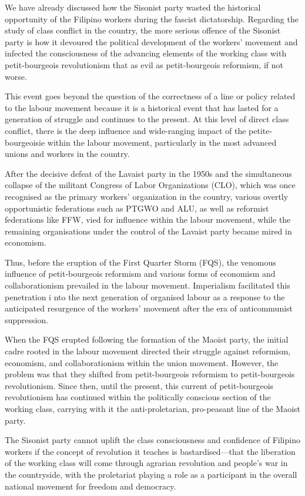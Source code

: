 We have already discussed 
how the Sisonist party 
wasted the historical opportunity of the Filipino workers 
during the fascist dictatorship. 
Regarding the study of class conflict in the country, 
the more serious offence of the Sisonist party 
is how it devoured the political development of the workers' movement 
and infected the consciousness of the advancing elements of the working class 
with petit-bourgeois revolutionism
that as evil as petit-bourgeois reformism,
if not worse.

This event goes beyond the question of the correctness 
of a line or policy related to the labour movement 
because it is a historical event 
that has lasted for a generation of struggle 
and continues to the present. 
At this level of direct class conflict, 
there is the deep influence and wide-ranging impact 
of the petite-bourgeoisie within the labour movement, 
particularly in the most advanced unions and workers in the country.

After the decisive defeat of the Lavaist party in the 1950s 
and the simultaneous collapse 
of the militant Congress of Labor Organizations (CLO), 
which was once recognised as the primary workers' organization in the country, 
various overtly opportunistic federations 
such as PTGWO and ALU, 
as well as reformist federations like FFW, 
vied for influence within the labour movement, 
while the remaining organisations
under the control of the Lavaist party 
became mired in economism.

Thus, 
before the eruption of the First Quarter Storm (FQS), 
the venomous influence of petit-bourgeois reformism 
and various forms of economism and collaborationism 
prevailed in the labour movement. 
Imperialism facilitated this penetration i
nto the next generation of organised labour 
as a response to the anticipated resurgence 
of the workers' movement after the era of anticommunist suppression.

When the FQS erupted following the formation of the Maoist party, 
the initial cadre rooted in the labour movement 
directed their struggle against reformism, economism, and collaborationism 
within the union movement. 
However, 
the problem was that they shifted from petit-bourgeois reformism 
to petit-bourgeois revolutionism. 
Since then, until the present, 
this current of petit-bourgeois revolutionism 
has continued within the politically conscious section of the working class, 
carrying with it the anti-proletarian, pro-peasant line of the Maoist party.

The Sisonist party cannot uplift the class consciousness 
and confidence of Filipino workers 
if the concept of revolution it teaches is bastardised---that 
the liberation of the working class will come 
through agrarian revolution and people's war in the countryside, 
with the proletariat playing a role as a participant 
in the overall national movement for freedom and democracy.

